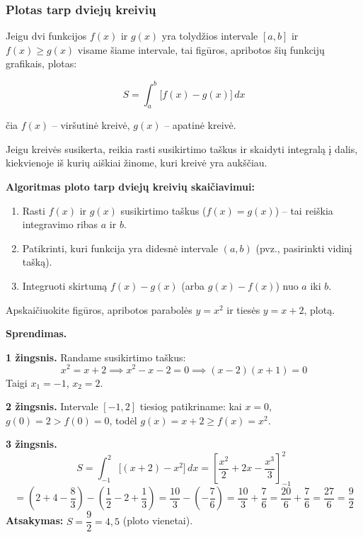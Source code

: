\subsubsection{Plotas tarp dviejų kreivių}

Jeigu dvi funkcijos $f(x)$ ir $g(x)$ yra tolydžios intervale $[a, b]$ ir $f(x) \geq g(x)$ visame šiame intervale, tai figūros, apribotos šių funkcijų grafikais, plotas:

\[
\boxed{S = \int_a^b \bigl[f(x) - g(x)\bigr]\, dx}
\]

čia $f(x)$ – viršutinė kreivė, $g(x)$ – apatinė kreivė.

\begin{remark}
Jeigu kreivės susikerta, reikia rasti susikirtimo taškus ir skaidyti integralą į dalis, kiekvienoje iš kurių aiškiai žinome, kuri kreivė yra aukščiau.
\end{remark}

\textbf{Algoritmas ploto tarp dviejų kreivių skaičiavimui:}
\begin{enumerate}
    \item Rasti $f(x)$ ir $g(x)$ susikirtimo taškus ($f(x) = g(x)$) – tai reiškia integravimo ribas $a$ ir $b$.
    \item Patikrinti, kuri funkcija yra didesnė intervale $(a, b)$ (pvz., pasirinkti vidinį tašką).
    \item Integruoti skirtumą $f(x) - g(x)$ (arba $g(x) - f(x)$) nuo $a$ iki $b$.
\end{enumerate}

\begin{example}
Apskaičiuokite figūros, apribotos parabolės $y = x^2$ ir tiesės $y = x + 2$, plotą.

\textbf{Sprendimas.}

\textbf{1 žingsnis.} Randame susikirtimo taškus:
\[
x^2 = x + 2 \implies x^2 - x - 2 = 0 \implies (x-2)(x+1) = 0
\]
Taigi $x_1 = -1$, $x_2 = 2$.

\textbf{2 žingsnis.} Intervale $[-1, 2]$ tiesiog patikriname: kai $x = 0$, $g(0) = 2 > f(0) = 0$, todėl $g(x) = x + 2 \geq f(x) = x^2$.

\textbf{3 žingsnis.}
\[
S = \int_{-1}^{2}\bigl[(x+2) - x^2\bigr]\, dx = \left[\frac{x^2}{2} + 2x - \frac{x^3}{3}\right]_{-1}^{2}
\]
\[
= \left(2 + 4 - \frac{8}{3}\right) - \left(\frac{1}{2} - 2 + \frac{1}{3}\right)
= \frac{10}{3} - \left(-\frac{7}{6}\right) = \frac{10}{3} + \frac{7}{6} = \frac{20}{6} + \frac{7}{6} = \frac{27}{6} = \frac{9}{2}
\]
\textbf{Atsakymas:} $S = \dfrac{9}{2} = 4{,}5$ (ploto vienetai).
\end{example}

